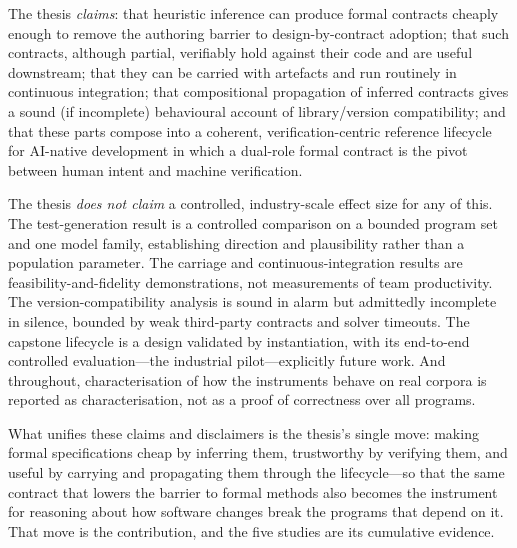 The thesis \emph{claims}: that heuristic inference can produce formal contracts
cheaply enough to remove the authoring barrier to design-by-contract adoption; that
such contracts, although partial, verifiably hold against their code and are useful
downstream; that they can be carried with artefacts and run routinely in continuous
integration; that compositional propagation of inferred contracts gives a sound (if
incomplete) behavioural account of library/version compatibility; and that these
parts compose into a coherent, verification-centric reference lifecycle for
AI-native development in which a dual-role formal contract is the pivot between
human intent and machine verification.

The thesis \emph{does not claim} a controlled, industry-scale effect size for any
of this. The test-generation result is a controlled comparison on a bounded
program set and one model family, establishing direction and plausibility rather
than a population parameter. The carriage and continuous-integration results are
feasibility-and-fidelity demonstrations, not measurements of team productivity. The
version-compatibility analysis is sound in alarm but admittedly incomplete in
silence, bounded by weak third-party contracts and solver timeouts. The capstone
lifecycle is a design validated by instantiation, with its end-to-end controlled
evaluation---the industrial pilot---explicitly future work. And throughout,
characterisation of how the instruments behave on real corpora is reported as
characterisation, not as a proof of correctness over all programs.

What unifies these claims and disclaimers is the thesis's single move: making
formal specifications cheap by inferring them, trustworthy by verifying them, and
useful by carrying and propagating them through the lifecycle---so that the same
contract that lowers the barrier to formal methods also becomes the instrument for
reasoning about how software changes break the programs that depend on it. That
move is the contribution, and the five studies are its cumulative evidence.
